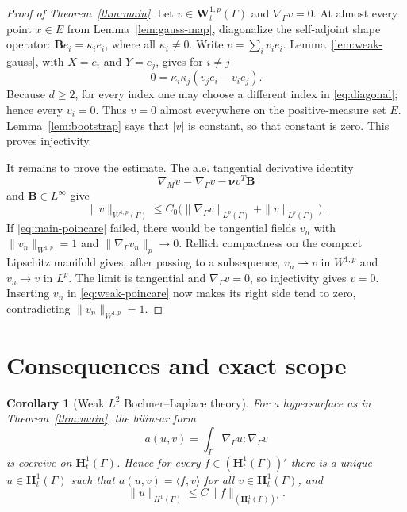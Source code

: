 \documentclass[11pt]{article}
\newtheorem{corollary}[theorem]{Corollary}
\newcommand{\G}{\Gamma}
\newcommand{\nuG}{\boldsymbol\nu}
\newcommand{\BG}{\mathbf B}
\newcommand{\nG}{\nabla_{\!\G}}
\newcommand{\nM}{\nabla_{\!M}}
\newcommand{\Wtp}[1]{\mathbf W^{1,#1}_t(\G)}
\begin{document}
\begin{proof}[Proof of Theorem~\ref{thm:main}]
Let $v\in\Wtp p$ and $\nG v=0$.  At almost every point $x\in E$ from
Lemma~\ref{lem:gauss-map}, diagonalize the self-adjoint shape operator:
$\BG e_i=\kappa_i e_i$, where all $\kappa_i\ne0$.  Write
$v=\sum_i v_i e_i$.  Lemma~\ref{lem:weak-gauss}, with $X=e_i$ and
$Y=e_j$, gives for $i\ne j$
\begin{equation}\label{eq:diagonal}
 0=\kappa_i\kappa_j(v_j e_i-v_i e_j).
\end{equation}
Because $d\ge2$, for every index one may choose a different index in
\eqref{eq:diagonal}; hence every $v_i=0$.  Thus $v=0$ almost everywhere on
the positive-measure set $E$.  Lemma~\ref{lem:bootstrap} says that $|v|$ is
constant, so that constant is zero.  This proves injectivity.

It remains to prove the estimate.  The a.e. tangential derivative identity
\begin{equation}\label{eq:norm-comparison}
 \nM v=\nG v-\nuG v^T\BG
\end{equation}
and $\BG\in L^\infty$ give
\begin{equation}\label{eq:weak-poincare}
 \|v\|_{W^{1,p}(\G)}
 \le C_0\bigl(\|\nG v\|_{L^p(\G)}+\|v\|_{L^p(\G)}\bigr).
\end{equation}
If \eqref{eq:main-poincare} failed, there would be tangential fields $v_n$
with $\|v_n\|_{W^{1,p}}=1$ and $\|\nG v_n\|_p\to0$.  Rellich compactness on
the compact Lipschitz manifold gives, after passing to a subsequence,
$v_n\rightharpoonup v$ in $W^{1,p}$ and $v_n\to v$ in $L^p$.  The limit is
tangential and $\nG v=0$, so injectivity gives $v=0$.  Inserting $v_n$ in
\eqref{eq:weak-poincare} now makes its right side tend to zero, contradicting
$\|v_n\|_{W^{1,p}}=1$.
\end{proof}

\section{Consequences and exact scope}

\begin{corollary}[Weak $L^2$ Bochner--Laplace theory]\label{cor:l2}
For a hypersurface as in Theorem~\ref{thm:main}, the bilinear form
\[
 a(u,v)=\int_\G \nG u:\nG v
\]
is coercive on $\mathbf H^1_t(\G)$.  Hence for every
$f\in(\mathbf H^1_t(\G))'$ there is a unique $u\in\mathbf H^1_t(\G)$ such
that $a(u,v)=\langle f,v\rangle$ for all $v\in\mathbf H^1_t(\G)$, and
\[
 \|u\|_{H^1(\G)}\le C\|f\|_{(\mathbf H^1_t(\G))'}.
\]
\end{corollary}
\end{document}
